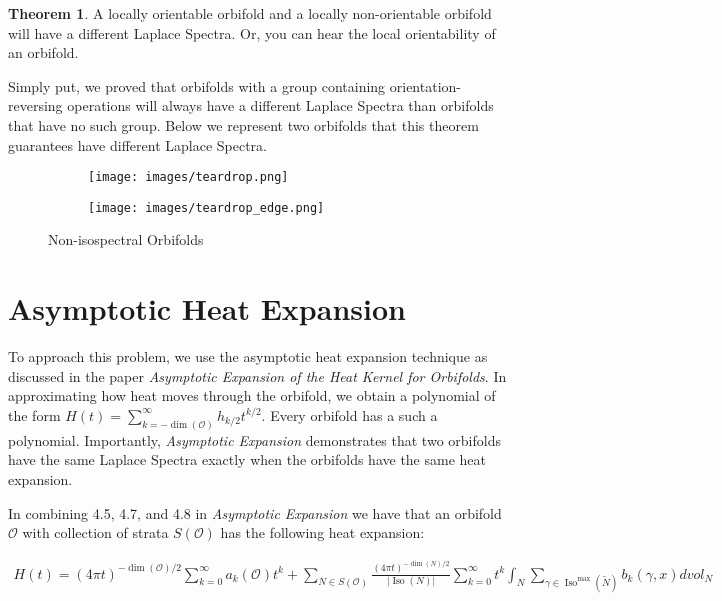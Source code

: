 \documentclass{article}[12pt]
\theoremstyle{definition}
\newtheorem*{theorem*}{Theorem}
\newcommand{\myabs}[1]{\vert#1\vert}
\newcommand{\orb}{\mathcal{O}}
\DeclareMathOperator{\iso}{Iso}
\begin{document}
\begin{theorem*}
    A locally orientable orbifold and a locally non-orientable orbifold
    will have a different Laplace Spectra. Or, you can hear the local
    orientability of an orbifold.
\end{theorem*}

 Simply put, we proved that orbifolds with a group containing
orientation-reversing operations will always have a different Laplace
Spectra than orbifolds that have no such group. Below we represent two
orbifolds that this theorem guarantees have different Laplace Spectra.

\begin{figure}[h]
    \centering
        \begin{subfigure}{0.25\textwidth}
            \texttt{[image: images/teardrop.png]} 
        \end{subfigure}
        \begin{subfigure}{0.25\textwidth}
            \texttt{[image: images/teardrop\_edge.png]}
        \end{subfigure}
        \caption{Non-isospectral Orbifolds}
        \label{fig:result_ex}
    \end{figure}

\section{Asymptotic Heat Expansion}
To approach this problem, we use the asymptotic heat expansion technique as
discussed in the paper \textit{Asymptotic Expansion of the Heat Kernel for
Orbifolds}. In approximating how heat moves through the orbifold, we obtain
a polynomial of the form $H(t) = \sum_{k=-\dim(\orb)}^{\infty} h_{k/2}
t^{k/2}$. Every orbifold has a such a polynomial. 
Importantly, \textit{Asymptotic Expansion} demonstrates that two orbifolds
have the same Laplace Spectra exactly when the orbifolds have the same heat
expansion.

In combining 4.5, 4.7, and 4.8 in \textit{Asymptotic Expansion} we have
that an orbifold $\orb$ with collection of strata $S(\orb)$ has the
following heat expansion:

\begin{align*}
    H(t) = {(4\pi t)}^{-\dim(\mathcal{O})/2}\sum_{k=0}^{\infty}a_k(\mathcal{O})t^k
            +\sum_{N \in S(\mathcal{O})}\frac{{(4\pi t)}^{-\dim(N)/2}}{\myabs{\iso(N)}}\sum_{k=0}^{\infty}t^k\int_{N} \sum_{\gamma \in \iso^{\max}(\tilde{N})}b_k(\gamma,x) dvol_N
\end{align*}
\end{document}
